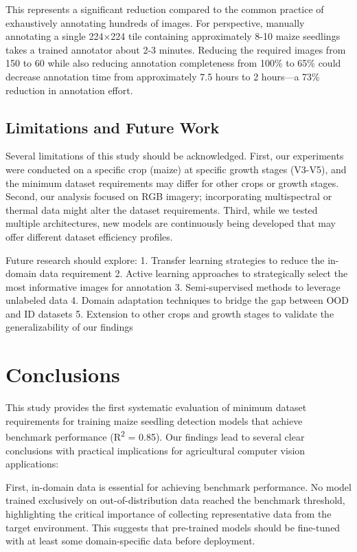 \documentclass{article}
\begin{document}
This represents a significant reduction compared to the common practice of exhaustively annotating hundreds of images. For perspective, manually annotating a single 224×224 tile containing approximately 8-10 maize seedlings takes a trained annotator about 2-3 minutes. Reducing the required images from 150 to 60 while also reducing annotation completeness from 100\% to 65\% could decrease annotation time from approximately 7.5 hours to 2 hours—a 73\% reduction in annotation effort.

\subsection{Limitations and Future Work}

Several limitations of this study should be acknowledged. First, our experiments were conducted on a specific crop (maize) at specific growth stages (V3-V5), and the minimum dataset requirements may differ for other crops or growth stages. Second, our analysis focused on RGB imagery; incorporating multispectral or thermal data might alter the dataset requirements. Third, while we tested multiple architectures, new models are continuously being developed that may offer different dataset efficiency profiles.

Future research should explore:
1. Transfer learning strategies to reduce the in-domain data requirement
2. Active learning approaches to strategically select the most informative images for annotation
3. Semi-supervised methods to leverage unlabeled data
4. Domain adaptation techniques to bridge the gap between OOD and ID datasets
5. Extension to other crops and growth stages to validate the generalizability of our findings

\section{Conclusions}

This study provides the first systematic evaluation of minimum dataset requirements for training maize seedling detection models that achieve benchmark performance (R\textsuperscript{2} = 0.85). Our findings lead to several clear conclusions with practical implications for agricultural computer vision applications:

First, in-domain data is essential for achieving benchmark performance. No model trained exclusively on out-of-distribution data reached the benchmark threshold, highlighting the critical importance of collecting representative data from the target environment. This suggests that pre-trained models should be fine-tuned with at least some domain-specific data before deployment.
\end{document}
